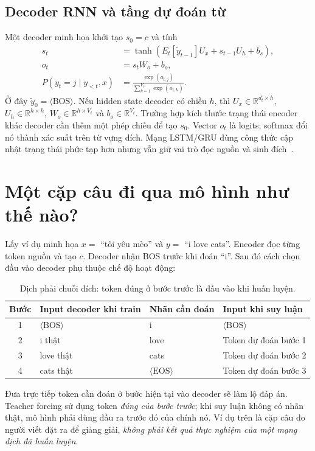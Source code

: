 \documentclass[11pt,a4paper]{article}
\begin{document}
\subsection{Decoder RNN và tầng dự đoán từ}
Một decoder minh họa khởi tạo $s_0=c$ và tính
\begin{align}
s_t&=\tanh\!\left(E_t[\tilde y_{t-1}]U_x+s_{t-1}U_h+b_s\right),\\
o_t&=s_tW_o+b_o,\\
P(y_t=j\mid y_{<t},x)&=\frac{\exp(o_{t,j})}{\sum_{k=1}^{V_t}\exp(o_{t,k})}.
\end{align}
Ở đây $\tilde y_0=\langle\mathrm{BOS}\rangle$. Nếu hidden state decoder có chiều $h$, thì $U_x\in\mathbb R^{d_t\times h}$, $U_h\in\mathbb R^{h\times h}$, $W_o\in\mathbb R^{h\times V_t}$ và $b_o\in\mathbb R^{V_t}$. Trường hợp kích thước trạng thái encoder khác decoder cần thêm một phép chiếu để tạo $s_0$. Vector $o_t$ là logits; softmax đổi nó thành xác suất trên từ vựng đích. Mạng LSTM/GRU dùng công thức cập nhật trạng thái phức tạp hơn nhưng vẫn giữ vai trò đọc nguồn và sinh đích~\cite{sutskever2014}.

\section{Một cặp câu đi qua mô hình như thế nào?}
Lấy ví dụ minh họa $x=$ ``tôi yêu mèo'' và $y=$ ``i love cats''. Encoder đọc từng token nguồn và tạo $c$. Decoder nhận BOS trước khi đoán ``i''. Sau đó cách chọn đầu vào decoder phụ thuộc chế độ hoạt động:
\begin{table}[ht]
\centering\small
\begin{tabular}{clll}\toprule
Bước & Input decoder khi train & Nhãn cần đoán & Input khi suy luận\\\midrule
1 & $\langle\mathrm{BOS}\rangle$ & i & $\langle\mathrm{BOS}\rangle$\\
2 & i thật & love & Token dự đoán bước 1\\
3 & love thật & cats & Token dự đoán bước 2\\
4 & cats thật & $\langle\mathrm{EOS}\rangle$ & Token dự đoán bước 3\\\bottomrule
\end{tabular}
\caption{Dịch phải chuỗi đích: token đúng ở bước trước là đầu vào khi huấn luyện.}
\end{table}
Đưa trực tiếp token cần đoán ở bước hiện tại vào decoder sẽ làm lộ đáp án. Teacher forcing sử dụng token \emph{đúng của bước trước}; khi suy luận không có nhãn thật, mô hình phải dùng đầu ra trước đó của chính nó. Ví dụ trên là cặp câu do người viết đặt ra để giảng giải, \emph{không phải kết quả thực nghiệm của một mạng dịch đã huấn luyện}.
\end{document}
